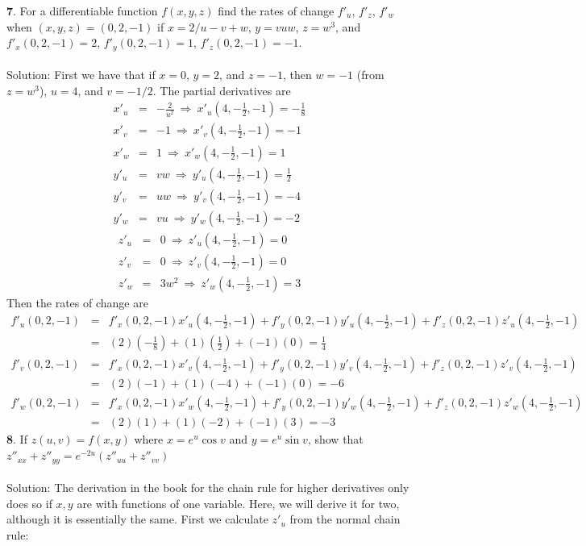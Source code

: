 \documentclass[12pt]{amsbook}
\begin{document}
{\small\bf 7}. For a differentiable function $f(x, y, z)$ find the rates of change $f'_u$, $f'_z$, $f'_w$ when $(x, y, z) = (0, 2, -1)$ if $x = 2/u - v + w$, $y = vuw$, $z = w^3$, and $f'_x(0,2,-1)=2$, $f'_y(0,2,-1)=1$, $f'_z(0,2,-1)=-1$.
\\
\\
{\sc Solution}: First we have that if $x=0$, $y=2$, and $z=-1$, then $w=-1$ (from $z=w^3$), $u=4$, and $v=-1/2$. The partial derivatives are
\begin{eqnarray*}
x'_u&=&-\frac{2}{u^2} \ \Rightarrow \ x'_u(4,-\frac{1}{2},-1)=-\frac{1}{8} \\
x'_v&=&-1 \ \Rightarrow \ x'_v(4,-\frac{1}{2},-1)=-1 \\
x'_w&=&1 \ \Rightarrow \ x'_w(4,-\frac{1}{2},-1)=1 \\
y'_u&=&vw \ \Rightarrow \ y'_u(4,-\frac{1}{2},-1)=\frac{1}{2} \\
y'_v&=&uw \ \Rightarrow \ y'_v(4,-\frac{1}{2},-1)=-4 \\
y'_w&=&vu \ \Rightarrow \ y'_w(4,-\frac{1}{2},-1)=-2 
\end{eqnarray*}
\begin{eqnarray*}
z'_u&=&0 \ \Rightarrow \ z'_u(4,-\frac{1}{2},-1)=0 \\
z'_v&=&0 \ \Rightarrow \ z'_v(4,-\frac{1}{2},-1)=0 \\
z'_w&=&3w^2 \ \Rightarrow \ z'_w(4,-\frac{1}{2},-1)=3 
\end{eqnarray*}
Then the rates of change are
\begin{eqnarray*}
f'_u(0,2,-1)&=&f'_x(0,2,-1)x'_u(4,-\frac{1}{2},-1)+f'_y(0,2,-1)y'_u(4,-\frac{1}{2},-1)+f'_z(0,2,-1)z'_u(4,-\frac{1}{2},-1) \\
&=&(2)(-\frac{1}{8})+(1)(\frac{1}{2})+(-1)(0)=\frac{1}{4} \\
f'_v(0,2,-1)&=&f'_x(0,2,-1)x'_v(4,-\frac{1}{2},-1)+f'_y(0,2,-1)y'_v(4,-\frac{1}{2},-1)+f'_z(0,2,-1)z'_v(4,-\frac{1}{2},-1) \\
&=&(2)(-1)+(1)(-4)+(-1)(0)=-6 \\
f'_w(0,2,-1)&=&f'_x(0,2,-1)x'_w(4,-\frac{1}{2},-1)+f'_y(0,2,-1)y'_w(4,-\frac{1}{2},-1)+f'_z(0,2,-1)z'_w(4,-\frac{1}{2},-1) \\
&=&(2)(1)+(1)(-2)+(-1)(3)=-3 
\end{eqnarray*}
{\small\bf 8}. If $z(u, v) = f(x, y)$ where $x = e^u
\cos v$ and $y = e^u\sin v$, show that $z''_{xx}+z''_{yy}=e^{-2u}(z''_{uu}+z''_{vv})$
\\
\\
{\sc Solution}: The derivation in the book for the chain rule for higher derivatives only does so if $x,y$ are with functions of one variable. Here, we will derive it for two, although it is essentially the same. First we calculate $z'_u$ from the normal chain rule:
\end{document}
